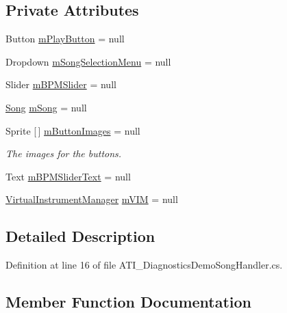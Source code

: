 \subsection*{Private Attributes}
\begin{DoxyCompactItemize}
\item 
Button \hyperlink{class_a_t_i___diagnostics_demo_song_handler_a364615af222e630eaca110b6d2afdec5}{m\+Play\+Button} = null
\item 
Dropdown \hyperlink{class_a_t_i___diagnostics_demo_song_handler_a9c44359a719997d03d3ce26afa5609db}{m\+Song\+Selection\+Menu} = null
\item 
Slider \hyperlink{class_a_t_i___diagnostics_demo_song_handler_ad501644f4b61fe763b75e5b63aa5badc}{m\+B\+P\+M\+Slider} = null
\item 
\hyperlink{class_song}{Song} \hyperlink{class_a_t_i___diagnostics_demo_song_handler_a8d34a075cf131a43db5e81cba4c9ea9d}{m\+Song} = null
\item 
Sprite \mbox{[}$\,$\mbox{]} \hyperlink{class_a_t_i___diagnostics_demo_song_handler_a26af0da356a95b5be50bb84647674c84}{m\+Button\+Images} = null
\begin{DoxyCompactList}\small\item\em The images for the buttons. \end{DoxyCompactList}\item 
Text \hyperlink{class_a_t_i___diagnostics_demo_song_handler_ada25fecbd1bc9aaf468b3206d62a9193}{m\+B\+P\+M\+Slider\+Text} = null
\item 
\hyperlink{class_virtual_instrument_manager}{Virtual\+Instrument\+Manager} \hyperlink{class_a_t_i___diagnostics_demo_song_handler_ac3a2216a6de2023d3dd19caa25de7d6f}{m\+V\+IM} = null
\end{DoxyCompactItemize}


\subsection{Detailed Description}


Definition at line 16 of file A\+T\+I\+\_\+\+Diagnostics\+Demo\+Song\+Handler.\+cs.



\subsection{Member Function Documentation}
\mbox{\label{class_a_t_i___diagnostics_demo_song_handler_a860f995ecf2cce11b2a9a3e8fe37237e}} 
